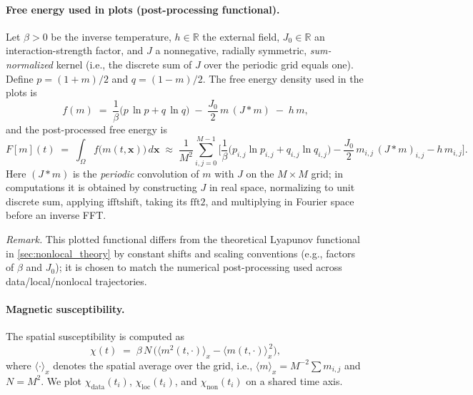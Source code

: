 \documentclass[11pt,a4paper]{article}
\begin{document}
\paragraph{Free energy used in plots (post-processing functional).} Let $\beta>0$ be the inverse temperature, $h\in\mathbb{R}$ the external field, $J_0\in\mathbb{R}$ an interaction-strength factor, and $J$ a nonnegative, radially symmetric, \emph{sum-normalized} kernel (i.e., the discrete sum of $J$ over the periodic grid equals one). Define $p=(1+m)/2$ and $q=(1-m)/2$. The free energy density used in the plots is
\begin{equation}
    f(m) \;=\; \frac{1}{\beta}\Big( p\,\ln p + q\,\ln q \Big)
    \; -\; \frac{J_0}{2}\, m\, (J*m)
    \; -\; h\, m,
\end{equation}
and the post-processed free energy is
\begin{equation}
    F[m](t) \;=\; \int_{\Omega} f\big(m(t,\mathbf{x})\big)\,d\mathbf{x}
    \;\approx\; \frac{1}{M^2} \sum_{i,j=0}^{M-1} \Bigg[ \frac{1}{\beta}\Big( p_{i,j}\ln p_{i,j} + q_{i,j}\ln q_{i,j} \Big)
    - \frac{J_0}{2}\, m_{i,j}\, (J*m)_{i,j}
    - h\, m_{i,j} \Bigg].
\end{equation}
Here $(J*m)$ is the \emph{periodic} convolution of $m$ with $J$ on the $M\times M$ grid; in computations it is obtained by constructing $J$ in real space, normalizing to unit discrete sum, applying $\mathrm{ifftshift}$, taking its $\mathrm{fft2}$, and multiplying in Fourier space before an inverse FFT.

\emph{Remark.} This plotted functional differs from the theoretical Lyapunov functional in \cref{sec:nonlocal_theory} by constant shifts and scaling conventions (e.g., factors of $\beta$ and $J_0$); it is chosen to match the numerical post-processing used across data/local/nonlocal trajectories.

\paragraph{Magnetic susceptibility.} The spatial susceptibility is computed as
\begin{equation}
    \chi(t) \;=\; \beta\,N\,\Big( \langle m^2(t,\cdot)\rangle_x - \langle m(t,\cdot)\rangle_x^{\,2} \Big),
\end{equation}
where $\langle\cdot\rangle_x$ denotes the spatial average over the grid, i.e., $\langle m\rangle_x = M^{-2}\sum m_{i,j}$ and $N=M^2$. We plot $\chi_{\text{data}}(t_i)$, $\chi_{\text{loc}}(t_i)$, and $\chi_{\text{non}}(t_i)$ on a shared time axis.
\end{document}
